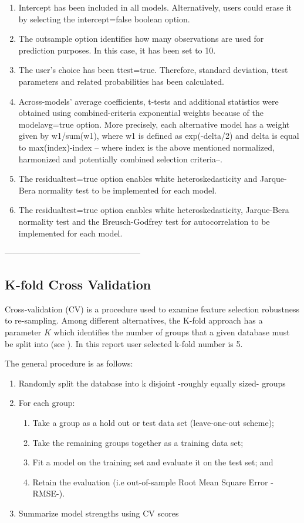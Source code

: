\documentclass{article}
\begin{document}
\begin{enumerate}
  \item Intercept has been included in all models. Alternatively, users could erase it by selecting the intercept=false boolean option.
  \item The outsample option identifies how many observations are used for prediction purposes. In this case, it has been set to 10.
  \item The user's choice has been ttest=true. Therefore, standard deviation, ttest parameters and related probabilities has been calculated.
  \item Across-models' average coefficients, t-tests and additional statistics were obtained using combined-criteria exponential weights because of the modelavg=true option. More precisely, each alternative model has a weight given by w1/sum(w1), where w1 is defined as exp(-delta/2) and delta is equal to max(index)-index -- where index is the above mentioned normalized, harmonized and potentially combined selection criteria--.
  \item The residualtest=true option enables white heteroskedasticity and Jarque-Bera normality test to be implemented for each model.
  \item The residualtest=true option enables white heteroskedasticity, Jarque-Bera normality test and the Breusch-Godfrey test for autocorrelation to be implemented for each model.
\end{enumerate}

--------------------------------------------------

\subsection{K-fold Cross Validation}

Cross-validation (CV) is a procedure used to examine feature selection robustness to re-sampling. Among different alternatives, the K-fold approach has a parameter $K$ which identifies the number of groups that a given database must be split into (see \cite{arlot2010}). In this report user selected k-fold number is 5.

The general procedure is as follows:

\begin{enumerate}
  \item Randomly split the database into k disjoint -roughly equally sized- groups
  \item For each group:
  \begin{enumerate}
    \item Take a group as a hold out or test data set (leave-one-out scheme);
    \item Take the remaining groups together as a training data set;
    \item Fit a model on the training set and evaluate it on the test set; and
    \item Retain the evaluation (i.e out-of-sample Root Mean Square Error -RMSE-).
  \end{enumerate}
  \item Summarize model strengths using CV scores
\end{enumerate}
\end{document}
